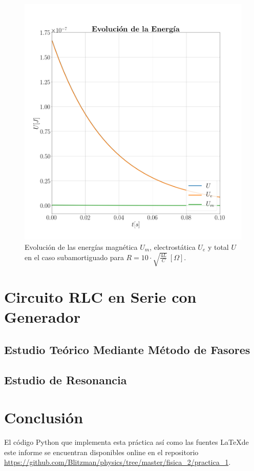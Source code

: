 \documentclass[journal]{IEEEtran}
\begin{document}
\begin{figure}[!htb]
    \centering
    \includegraphics[width=\linewidth,trim={40 70 70 70},clip]{energiasobreamortiguado.png}
    \caption{Evolución de las energías magnética $U_m$, electrostática $U_e$ y total $U$ en el caso subamortiguado para $R=10 \cdot\sqrt{\frac{4L}{C}}~[\Omega]$.}
    \label{fig:energiasobreamortiguado}
\end{figure}

\section{Circuito RLC en Serie con Generador}
\label{sec:rlccongenerador}

\subsection{Estudio Teórico Mediante Método de Fasores}
\label{subsec:estudioteorico}

\subsection{Estudio de Resonancia}
\label{subsec:estudioresonancia}

\section{Conclusión}
\label{sec:conclusion}

\clearpage

El código Python que implementa esta práctica así como las fuentes \LaTeX de este informe se encuentran disponibles online en el repositorio \url{https://github.com/Blitzman/physics/tree/master/fisica_2/practica_1}.
\end{document}

